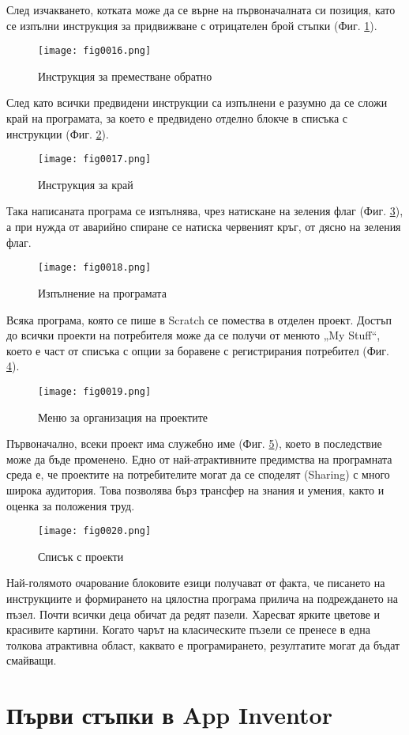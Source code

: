 След изчакването, котката може да се върне на първоначалната си позиция, като се изпълни инструкция за придвижване с отрицателен брой стъпки (Фиг. \ref{fig0016}).

\begin{figure}[H]
  \centering
  \texttt{[image: fig0016.png]}
  \caption{Инструкция за преместване обратно}
\label{fig0016}
\end{figure}

След като всички предвидени инструкции са изпълнени е разумно да се сложи край на програмата, за което е предвидено отделно блокче в списъка с инструкции (Фиг. \ref{fig0017}).

\begin{figure}[H]
  \centering
  \texttt{[image: fig0017.png]}
  \caption{Инструкция за край}
\label{fig0017}
\end{figure}

Така написаната програма се изпълнява, чрез натискане на зеления флаг (Фиг. \ref{fig0018}), а при нужда от аварийно спиране се натиска червеният кръг, от дясно на зеления флаг.

\begin{figure}[H]
  \centering
  \texttt{[image: fig0018.png]}
  \caption{Изпълнение на програмата}
\label{fig0018}
\end{figure}

Всяка програма, която се пише в Scratch се помества в отделен проект. Достъп до всички проекти на потребителя може да се получи от менюто „My Stuff“, което е част от списъка с опции за боравене с регистрирания потребител (Фиг. \ref{fig0019}).

\begin{figure}[H]
  \centering
  \texttt{[image: fig0019.png]}
  \caption{Меню за организация на проектите}
\label{fig0019}
\end{figure}

Първоначално, всеки проект има служебно име (Фиг. \ref{fig0020}), което в последствие може да бъде променено. Едно от най-атрактивните предимства на програмната среда е, че проектите на потребителите могат да се споделят (Sharing) с много широка аудитория. Това позволява бърз трансфер на знания и умения, както и оценка за положения труд. 

\begin{figure}[H]
  \centering
  \texttt{[image: fig0020.png]}
  \caption{Списък с проекти}
\label{fig0020}
\end{figure}

Най-голямото очарование блоковите езици получават от факта, че писането на инструкциите и формирането на цялостна програма прилича на подреждането на пъзел. Почти всички деца обичат да редят пазели. Харесват ярките цветове и красивите картини. Когато чарът на класическите пъзели се пренесе в една толкова атрактивна област, каквато е програмирането, резултатите могат да бъдат смайващи. 

\section{Първи стъпки в App Inventor}

